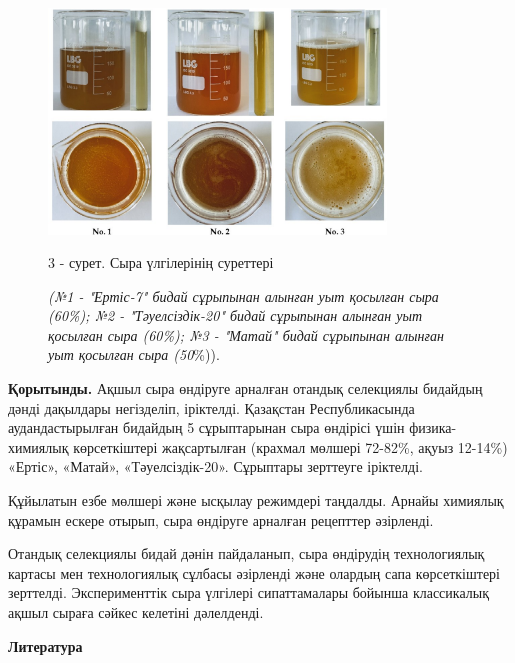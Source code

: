 \begin{figure}[H]
	\centering
	\includegraphics[width=0.8\textwidth]{media/pish3/image6}
	\caption*{3 - сурет. Сыра үлгілерінің суреттері}
	\caption*{\normalfont\emph{(№1 - "Ертіс-7" бидай сұрыпынан алынған уыт қосылған сыра (60\%); №2 - "Тәуелсіздік-20" бидай сұрыпынан алынған уыт қосылған сыра (60\%); №3 - "Матай" бидай сұрыпынан алынған уыт қосылған сыра (50}\%)).}
\end{figure}

\begin{multicols}{2}
{\bfseries Қорытынды.} Ақшыл сыра өндіруге арналған отандық селекциялы
бидайдың дәнді дақылдары негізделіп, іріктелді. Қазақстан
Республикасында аудандастырылған бидайдың 5 сұрыптарынан сыра өндірісі
үшін физика-химиялық көрсеткіштері жақсартылған (крахмал мөлшері
72-82\%, ақуыз 12-14\%) «Ертіс», «Матай», «Тәуелсіздік-20». Сұрыптары
зерттеуге іріктелді.

Құйылатын езбе мөлшері және ысқылау режимдері таңдалды. Арнайы химиялық
құрамын ескере отырып, сыра өндіруге арналған рецепттер әзірленді.

Отандық селекциялы бидай дәнін пайдаланып, сыра өндірудің технологиялық
картасы мен технологиялық сұлбасы әзірленді және олардың сапа
көрсеткіштері зерттелді. Эксперименттік сыра үлгілері сипаттамалары
бойынша классикалық ақшыл сыраға сәйкес келетіні дәлелденді.
\end{multicols}

\begin{center}
{\bfseries Литература}
\end{center}

